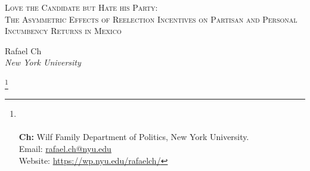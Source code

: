 \documentclass[12pt]{amsart}
\title{}
\numberwithin{equation}{section}
\theoremstyle{definition}
\theoremstyle{definition}
\theoremstyle{definition}
\begin{document}
	\vspace*{3ex minus 1ex}
	\begin{center}
		\Large \textsc{Love the Candidate but Hate his Party: \\  The Asymmetric Effects of Reelection Incentives on Partisan and Personal Incumbency Returns in Mexico}
	\end{center}
	
	
\date{June 11, 2021} 
\vspace*{3ex minus 1ex}
	\begin{center}
		Rafael Ch\\
		
		\textit{New York University}\\
		
	\end{center}
	 
	\thanks{%
	\\
	 \\ \textbf{Ch:} Wilf Family Department of Politics, New York University. \\ Email: \url{rafael.ch@nyu.edu}
	 \\ Website: \url{https://wp.nyu.edu/rafaelch/}}
		  
\end{document}
